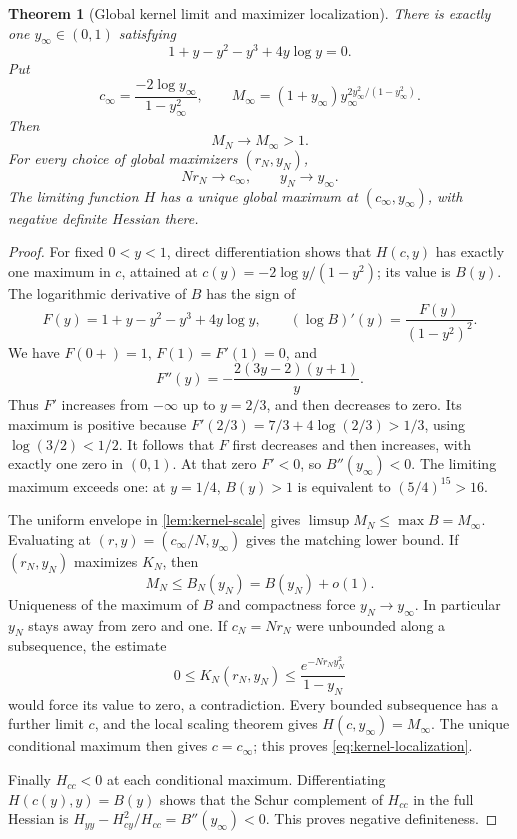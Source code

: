 \documentclass[11pt]{article}
\numberwithin{equation}{section}
\newtheorem{theorem}{Theorem}[section]
\theoremstyle{definition}
\theoremstyle{remark}
\begin{document}
\begin{theorem}[Global kernel limit and maximizer localization]
\label{thm:kernel-global-limit}
There is exactly one $y_\infty\in(0,1)$ satisfying
\begin{equation}\label{eq:yinfty}
 1+y-y^2-y^3+4y\log y=0.
\end{equation}
Put
\begin{equation}\label{eq:cinfty}
 c_\infty=\frac{-2\log y_\infty}{1-y_\infty^2},\qquad
 M_\infty=(1+y_\infty)
      y_\infty^{2y_\infty^2/(1-y_\infty^2)}.
\end{equation}
Then
\begin{equation}\label{eq:Mnlimit}
 M_N\longrightarrow M_\infty>1.
\end{equation}
For \emph{every} choice of global maximizers $(r_N,y_N)$,
\begin{equation}\label{eq:kernel-localization}
 Nr_N\longrightarrow c_\infty,\qquad y_N\longrightarrow y_\infty.
\end{equation}
The limiting function $H$ has a unique global maximum at
$(c_\infty,y_\infty)$, with negative definite Hessian there.
\end{theorem}
\begin{proof}
For fixed $0<y<1$, direct differentiation shows that $H(c,y)$ has
exactly one maximum in $c$, attained at
$c(y)=-2\log y/(1-y^2)$; its value is $B(y)$.
The logarithmic derivative of $B$ has the sign of
\[
 F(y)=1+y-y^2-y^3+4y\log y,
 \qquad
 (\log B)'(y)=\frac{F(y)}{(1-y^2)^2}.
\]
We have $F(0+)=1$, $F(1)=F'(1)=0$, and
\[
 F''(y)=-\frac{2(3y-2)(y+1)}y.
\]
Thus $F'$ increases from $-\infty$ up to $y=2/3$, and then decreases
to zero. Its maximum is positive because
$F'(2/3)=7/3+4\log(2/3)>1/3$, using $\log(3/2)<1/2$.
It follows that $F$ first decreases and then increases, with exactly
one zero in $(0,1)$. At that zero $F'<0$, so $B''(y_\infty)<0$.
The limiting maximum exceeds one: at $y=1/4$,
$B(y)>1$ is equivalent to $(5/4)^{15}>16$.

The uniform envelope in \cref{lem:kernel-scale} gives
$\limsup M_N\le\max B=M_\infty$. Evaluating at
$(r,y)=(c_\infty/N,y_\infty)$ gives the matching lower bound.
If $(r_N,y_N)$ maximizes $K_N$, then
\[
 M_N\le B_N(y_N)=B(y_N)+o(1).
\]
Uniqueness of the maximum of $B$ and compactness force $y_N\to y_\infty$.
In particular $y_N$ stays away from zero and one. If $c_N=Nr_N$
were unbounded along a subsequence, the estimate
\[
 0\le K_N(r_N,y_N)
 \le\frac{e^{-Nr_Ny_N^2}}{1-y_N}
\]
would force its value to zero, a contradiction. Every bounded
subsequence has a further limit $c$, and the local scaling theorem
gives $H(c,y_\infty)=M_\infty$. The unique conditional maximum
then gives $c=c_\infty$; this proves \eqref{eq:kernel-localization}.

Finally $H_{cc}<0$ at each conditional maximum. Differentiating
$H(c(y),y)=B(y)$ shows that the Schur complement of $H_{cc}$ in
the full Hessian is
$H_{yy}-H_{cy}^2/H_{cc}=B''(y_\infty)<0$.
This proves negative definiteness.
\end{proof}
\end{document}
